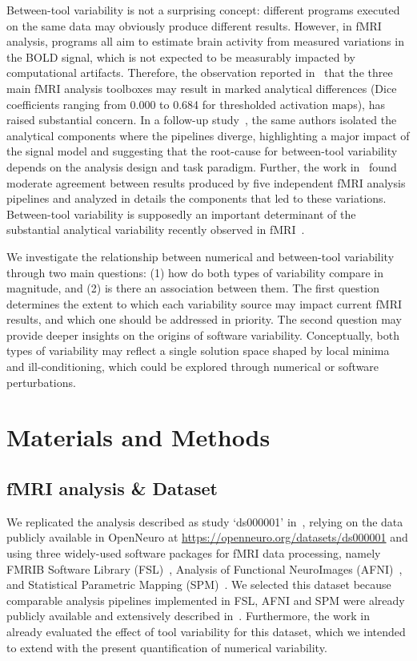 \documentclass[11pt,onecolumn]{article}
\begin{document}
Between-tool variability is not a surprising concept: different programs
executed on the same data may obviously produce different results. However,
in fMRI analysis, programs all aim to estimate brain activity from measured
variations in the BOLD signal, which is not expected to be measurably
impacted by computational artifacts. Therefore, the observation reported
in~\cite{bowring2019exploring} that the three main fMRI analysis toolboxes
may result in marked analytical differences (Dice coefficients ranging from
0.000 to 0.684 for thresholded activation maps), has raised substantial
concern. In a follow-up study~\cite{bowring2021isolating}, the same authors
isolated the analytical components where the pipelines diverge,
highlighting a major impact of the signal model and suggesting that the
root-cause for between-tool variability depends on the analysis design and
task paradigm. Further, the work in~\cite{Li2021.12.01.470790} found
moderate agreement between results produced by five independent fMRI
analysis pipelines and analyzed in details the components that led to these
variations. Between-tool variability is supposedly an important determinant
of the substantial analytical variability recently observed in
fMRI~\cite{botvinik2020variability}.

We investigate the relationship between numerical and between-tool
variability through two main questions: (1) how do both types of
variability compare in magnitude, and (2) is there an association between
them. The first question determines the extent to which each variability
source may impact current fMRI results, and which one should be addressed
in priority. The second question may provide deeper insights on the origins
of software variability. Conceptually, both types of variability may
reflect a single solution space shaped by local minima and
ill-conditioning, which could be explored through numerical or software
perturbations.


\section{Materials and Methods}

\subsection{fMRI analysis \& Dataset}

We replicated the analysis described as study `ds000001'
in~\cite{schonberg2012decreasing}, relying on the data publicly available
in OpenNeuro at \url{https://openneuro.org/datasets/ds000001} and using
three widely-used software packages for fMRI data processing, namely FMRIB
Software Library (FSL)~\cite{jenkinson2012fsl}, Analysis of Functional
NeuroImages (AFNI)~\cite{cox1996afni}, and Statistical Parametric
Mapping (SPM)~\cite{penny2011statistical}. We selected this dataset because
comparable analysis pipelines implemented in FSL, AFNI and SPM were already 
publicly available and extensively described in~\cite{bowring2019exploring}.
Furthermore, the work in~\cite{bowring2019exploring} already evaluated the
effect of tool variability for this dataset, which we intended to
extend with the present quantification of numerical variability.
\end{document}
